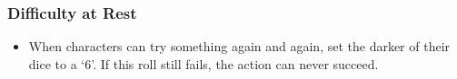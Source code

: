 \subsubsection{Difficulty at Rest}

\begin{itemize}
  \item
  When characters can try something again and again, set the darker of their dice to a `6'.
  If this roll still fails, the action can never succeed.
\end{itemize}

